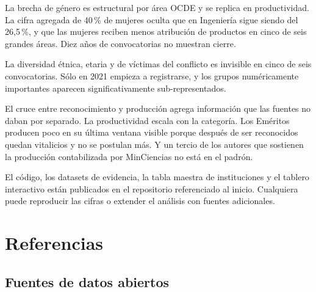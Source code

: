 \documentclass[11pt,a4paper,oneside]{article}
\begin{document}
La brecha de género es estructural por área OCDE y se replica en productividad. La cifra agregada de 40\,\% de mujeres oculta que en Ingeniería sigue siendo del 26{,}5\,\%, y que las mujeres reciben menos atribución de productos en cinco de seis grandes áreas. Diez años de convocatorias no muestran cierre.

La diversidad étnica, etaria y de víctimas del conflicto es invisible en cinco de seis convocatorias. Sólo en 2021 empieza a registrarse, y los grupos numéricamente importantes aparecen significativamente sub-representados.

El cruce entre reconocimiento y producción agrega información que las fuentes no daban por separado. La productividad escala con la categoría. Los Eméritos producen poco en su última ventana visible porque después de ser reconocidos quedan vitalicios y no se postulan más. Y un tercio de los autores que sostienen la producción contabilizada por MinCiencias no está en el padrón.

El código, los datasets de evidencia, la tabla maestra de instituciones y el tablero interactivo están publicados en el repositorio referenciado al inicio. Cualquiera puede reproducir las cifras o extender el análisis con fuentes adicionales.

\section{Referencias}\label{sec:referencias}

\subsection*{Fuentes de datos abiertos}
\end{document}
